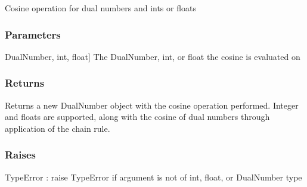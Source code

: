 \documentclass[letterpaper,10pt,english]{sphinxmanual}
\begin{document}
\begin{fulllineitems}
\label{\detokenize{autodiff:autodiff.operators.cos}}
\pysigstartsignatures
{}
\pysigstopsignatures
\sphinxAtStartPar
Cosine operation for dual numbers and ints or floats


\subsubsection{Parameters}
\label{\detokenize{autodiff:id15}}\begin{description}
\sphinxlineitem{x}{[}DualNumber, int, float{]}
\sphinxAtStartPar
The DualNumber, int, or float the cosine is evaluated on

\end{description}


\subsubsection{Returns}
\label{\detokenize{autodiff:id16}}\begin{description}
\sphinxAtStartPar
Returns a new DualNumber object with the cosine operation performed. Integer and
floats are supported, along with the cosine of dual numbers through application 
of the chain rule.

\end{description}


\subsubsection{Raises}
\label{\detokenize{autodiff:id17}}
\sphinxAtStartPar
TypeError : raise TypeError if argument is not of int, float, or DualNumber type

\end{fulllineitems}

\end{document}
